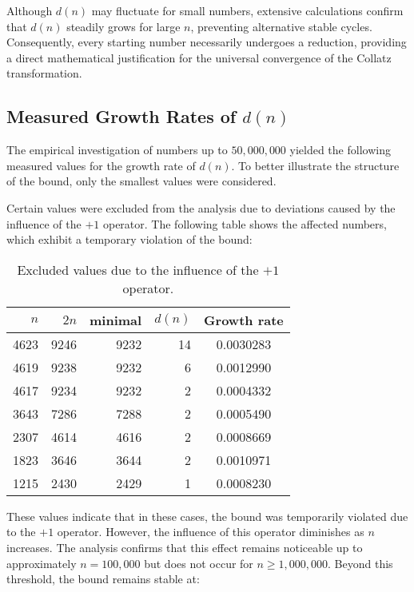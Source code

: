 \documentclass[a4paper,12pt]{article}
\begin{document}
Although \( d(n) \) may fluctuate for small numbers, extensive calculations confirm that \( d(n) \) steadily grows for large \( n \), preventing alternative stable cycles. Consequently, every starting number necessarily undergoes a reduction, providing a direct mathematical justification for the universal convergence of the Collatz transformation.

\subsection{Measured Growth Rates of \( d(n) \)}

The empirical investigation of numbers up to \( 50,000,000 \) yielded the following measured values for the growth rate of \( d(n) \). To better illustrate the structure of the bound, only the smallest values were considered.

Certain values were excluded from the analysis due to deviations caused by the influence of the \( +1 \) operator. The following table shows the affected numbers, which exhibit a temporary violation of the bound:

\begin{table}[h]
    \centering
    \begin{tabular}{|r|r|r|r|c|}
        \hline
        \( n \) & \( 2n \) & minimal & \( d(n) \) & Growth rate \\
        \hline
        4623  & 9246  & 9232  & 14  & 0.0030283 \\
        4619  & 9238  & 9232  & 6   & 0.0012990 \\
        4617  & 9234  & 9232  & 2   & 0.0004332 \\
        3643  & 7286  & 7288  & 2   & 0.0005490 \\
        2307  & 4614  & 4616  & 2   & 0.0008669 \\
        1823  & 3646  & 3644  & 2   & 0.0010971 \\
        1215  & 2430  & 2429  & 1   & 0.0008230 \\
        \hline
    \end{tabular}
    \caption{Excluded values due to the influence of the \( +1 \) operator.}
\end{table}

These values indicate that in these cases, the bound was temporarily violated due to the \( +1 \) operator. However, the influence of this operator diminishes as \( n \) increases. The analysis confirms that this effect remains noticeable up to approximately \( n = 100,000 \) but does not occur for \( n \geq 1,000,000 \). Beyond this threshold, the bound remains stable at:
\end{document}
